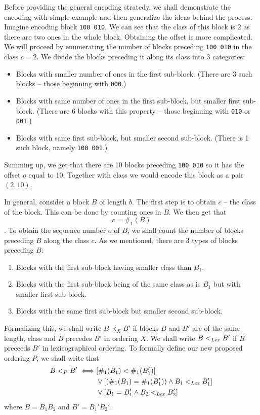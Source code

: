 Before providing the general encoding stratedy, we shall demonstrate the encoding with
simple example and then generalize the ideas behind the process. Imagine encoding
block {\tt 100 010}. We can see that the class of this block is 2 as there are two ones in
the whole block. Obtaining the offset is more complicated. We will proceed by enumerating the
number of blocks preceding {\tt 100 010} in the class $c=2$. We divide the blocks preceding it
along its class into 3 categories:

\begin{itemize}
    \item Blocks with smaller number of ones in the first sub-block.
    (There are 3 such blocks -- those beginning with {\tt 000}.)
    \item Blocks with same number of ones in the first sub-block, but smaller first sub-block.
    (There are 6 blocks with this property -- those beginning with {\tt 010} or {\tt 001}.)
    \item Blocks with same first sub-block, but smaller second sub-block.
    (There is 1 such block, namely {\tt 100 001}.)
\end{itemize}

Summing up, we get that there are 10 blocks preceding {\tt 100 010} so it has the offset $o$
equal to 10. Together with class we would encode this block as a pair $(2, 10)$.

In general, consider a block $B$ of length $b$. The first step is to obtain
$c$ -- the class of the block. This can be done by counting ones in $B$. We
then get that $$c=\#_1(B)$$. To obtain the sequence number $o$ of $B$, we shall
count the number of blocks preceding $B$ along the class $c$. As we mentioned,
there are 3 types of blocks preceding $B$:

\begin{enumerate}
    \item Blocks with the first sub-block having smaller class than $B_1$.
    \label{chapter3:encoding:1}
    \item Blocks with the first sub-block being of the same class as is $B_1$
    but with smaller first sub-block. \label{chapter3:encoding:2}
    \item Blocks with the same first sub-block but smaller second sub-block.
    \label{chapter3:encoding:3}
\end{enumerate}

Formalizing this, we shall write $B\prec_X B'$ if blocks $B$ and $B'$ are of
the same length, class and $B$ precedes $B'$ in ordering $X$. We shall
write $B<_{\mathit{Lex}} B'$ if $B$ preceeds $B'$ in lexicographical ordering.
To formally define our new proposed ordering $P$, we shall write that
\begin{align*}
    B<_P B' \iff
    &[\#_1(B_1) < \#_1(B_1')] \\
    &\lor [(\#_1(B_1) = \#_1(B_1')) \land B_1 <_{\mathit{Lex}} B_1']\\
    &\lor [B_1 = B_1' \land B_2 <_{\mathit{Lex}} B_2']
\end{align*}
where $B=B_1B_2$ and $B'=B_1'B_2'$.

